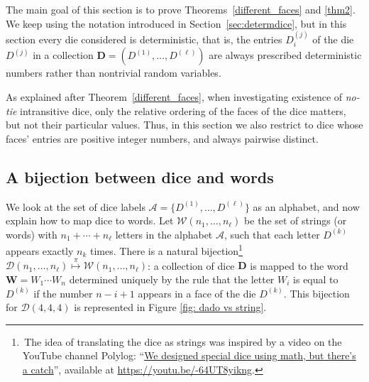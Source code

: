 \documentclass[reqno,a4paper,11pt]{amsart}
\theoremstyle{remark}
\newcommand{\mc}[1]{{\mathcal #1}}
\newcommand{\mb}[1]{{\mathbf #1}}
\numberwithin{equation}{section}
\begin{document}
The main goal of this section is to prove Theorems~\ref{different_faces} and \ref{thm2}.
We keep using the notation introduced in Section~\ref{sec:determdice}, but in this section every die considered is deterministic, that is, the entries $D_i^{(j)}$ of the die $D^{(j)}$ in a collection $\mb D=(D^{(1)},\hdots, D^{(\ell)})$ are always prescribed deterministic numbers rather than nontrivial random variables.

As explained after Theorem~\ref{different_faces}, when investigating existence of {\it no-tie} intransitive dice, only the relative ordering of the faces of the dice matters, but not their particular values. Thus, in this section we also restrict to dice whose faces' entries are positive integer numbers, and always pairwise distinct.

\subsection{A bijection between dice and words}\label{sec:dicewords}\hfill

We look at the set of dice labels $\mc A= \{D^{(1)},\hdots, D^{(\ell)}\}$ as an alphabet, and now explain how to map dice to words. Let $\mc W(n_1,\hdots, n_\ell)$ be the set of strings (or words) with $n_1+\cdots+n_\ell$ letters in the alphabet $\mc A$, such that each letter $D^{(k)}$ appears exactly $n_k$ times. There is a natural bijection\protect\footnote{\,The idea of translating the dice as strings was inspired by a video on the YouTube channel Polylog: ``\href{https://youtu.be/-64UT8yikng}{We designed special dice using math, but there’s a catch}\textquotedblright , available at \url{https://youtu.be/-64UT8yikng}.}
 $\mc D(n_1,\hdots, n_\ell)\stackrel{\pi}{\mapsto }\mc W(n_1,\hdots, n_\ell)$: a collection of dice $\mb D$ is mapped to the word $\mb W=W_1\cdots W_n$ determined uniquely by the rule that the letter $W_i$ is equal to $D^{(k)}$ if the number $n-i+1$ appears in a face of the die $D^{(k)}$. This bijection for $\mc D(4,4,4)$ is represented in Figure \ref{fig: dado vs string}.
\end{document}
